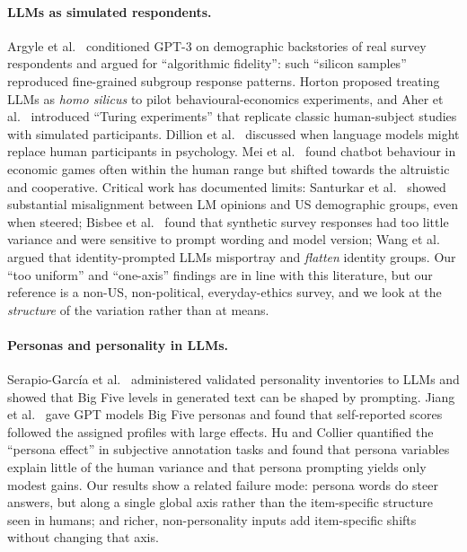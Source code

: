 \documentclass[11pt]{article}
\begin{document}
\paragraph{LLMs as simulated respondents.}
Argyle et al.\ \citep{argyle2023out} conditioned GPT-3 on demographic backstories of real survey respondents and argued for ``algorithmic fidelity'': such ``silicon samples'' reproduced fine-grained subgroup response patterns. Horton \citep{horton2023homo} proposed treating LLMs as \emph{homo silicus} to pilot behavioural-economics experiments, and Aher et al.\ \citep{aher2023using} introduced ``Turing experiments'' that replicate classic human-subject studies with simulated participants. Dillion et al.\ \citep{dillion2023can} discussed when language models might replace human participants in psychology. Mei et al.\ \citep{mei2024turing} found chatbot behaviour in economic games often within the human range but shifted towards the altruistic and cooperative. Critical work has documented limits: Santurkar et al.\ \citep{santurkar2023whose} showed substantial misalignment between LM opinions and US demographic groups, even when steered; Bisbee et al.\ \citep{bisbee2024synthetic} found that synthetic survey responses had too little variance and were sensitive to prompt wording and model version; Wang et al.\ \citep{wang2024flatten} argued that identity-prompted LLMs misportray and \emph{flatten} identity groups. Our ``too uniform'' and ``one-axis'' findings are in line with this literature, but our reference is a non-US, non-political, everyday-ethics survey, and we look at the \emph{structure} of the variation rather than at means.

\paragraph{Personas and personality in LLMs.}
Serapio-Garc{\'i}a et al.\ \citep{serapio2023personality} administered validated personality inventories to LLMs and showed that Big Five levels in generated text can be shaped by prompting. Jiang et al.\ \citep{jiang2024personallm} gave GPT models Big Five personas and found that self-reported scores followed the assigned profiles with large effects. Hu and Collier \citep{hu2024persona} quantified the ``persona effect'' in subjective annotation tasks and found that persona variables explain little of the human variance and that persona prompting yields only modest gains. Our results show a related failure mode: persona words do steer answers, but along a single global axis rather than the item-specific structure seen in humans; and richer, non-personality inputs add item-specific shifts without changing that axis.
\end{document}
